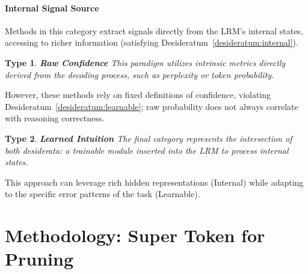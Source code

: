 \documentclass[11pt]{article}
\theoremstyle{plain}
\newtheorem{type}{Type}
\begin{document}
\paragraph{Internal Signal Source}
Methods in this category extract signals directly from the LRM's internal states, accessing to richer information (satisfying Desideratum~\ref{desideratum:internal}).

\begin{type}\label{type:stats} \textbf{Raw Confidence}
This paradigm utilizes intrinsic metrics directly derived from the decoding process, such as perplexity or token probability.
\end{type}
However, these methods rely on fixed definitions of confidence, violating Desideratum~\ref{desideratum:learnable}; raw probability does not always correlate with reasoning correctness.

\begin{type}\label{type:module} \textbf{Learned Intuition}
The final category represents the intersection of both desiderata: a trainable module inserted into the LRM to process internal states.
\end{type}
This approach can leverage rich hidden representations (Internal) while adapting to the specific error patterns of the task (Learnable).



\section{Methodology: Super Token for Pruning}

\end{document}
